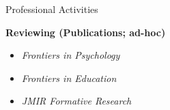 \documentclass{resume} %
\begin{document}
\begin{rSection}{Professional Activities}

\textbf{Reviewing (Publications; ad-hoc)}
\begin{itemize}
    \item \textit{Frontiers in Psychology}
    \item \textit{Frontiers in Education}
    \item \textit{JMIR Formative Research}
\end{itemize}

\end{rSection}

\end{document}
